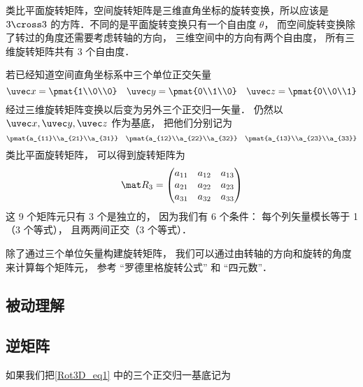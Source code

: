 
\begin{issues}
\issueDraft
\end{issues}


类比平面旋转矩阵，空间旋转矩阵是三维直角坐标的旋转变换，所以应该是 $3 \cross 3$ 的方阵．不同的是平面旋转变换只有一个自由度 $\theta $， 而空间旋转变换除了转过的角度还需要考虑转轴的方向， 三维空间中的方向有两个自由度， 所有三维旋转矩阵共有 3 个自由度．

若已经知道空间直角坐标系中三个单位正交矢量
\begin{equation}
\uvec x=\pmat{1\\0\\0} \quad \uvec y=\pmat{0\\1\\0} \quad \uvec z=\pmat{0\\0\\1}
\end{equation}
经过三维旋转矩阵变换以后变为另外三个正交归一矢量． 仍然以 $\uvec x, \uvec y, \uvec z$ 作为基底， 把他们分别记为
\begin{equation}\label{Rot3D_eq1}
\pmat{a_{11}\\a_{21}\\a_{31}} \quad \pmat{a_{12}\\a_{22}\\a_{32}} \quad \pmat{a_{13}\\a_{23}\\a_{33}}
\end{equation}
类比平面旋转矩阵， 可以得到旋转矩阵为
\begin{equation}
\mat R_3 = \begin{pmatrix}
{a_{11}}&{a_{12}}&{a_{13}}\\
{a_{21}}&{a_{22}}&{a_{23}}\\
{a_{31}}&{a_{32}}&{a_{33}}
\end{pmatrix}\end{equation}
这 9 个矩阵元只有 3 个是独立的， 因为我们有 6 个条件： 每个列矢量模长等于 1（3 个等式）， 且两两间正交（3 个等式）．

除了通过三个单位矢量构建旋转矩阵， 我们可以通过由转轴的方向和旋转的角度来计算每个矩阵元， 参考 “罗德里格旋转公式” 和 “四元数”．

\subsection{被动理解}


\subsection{逆矩阵}
如果我们把\autoref{Rot3D_eq1} 中的三个正交归一基底记为 


